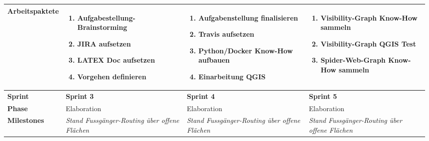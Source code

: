 \begin{landscape}
\begin{longtable}{l p{5.5cm} p{5.5cm} p{5.5cm}}
        \textbf{Arbeitspaktete}
                                & \begin{enumerate}[noitemsep]
                                    \item Aufgabestellung-Brainstorming
                                    \item JIRA aufsetzen
                                    \item LATEX Doc aufsetzen
                                    \item Vorgehen definieren
                                \end{enumerate}
                                & \begin{enumerate}[noitemsep]
                                    \item Aufgabenstellung finalisieren
                                    \item Travis aufsetzen
                                    \item Python/Docker Know-How aufbauen
                                    \item Einarbeitung QGIS
                                \end{enumerate}
                                & \begin{enumerate}[noitemsep]
                                    \item Visibility-Graph Know-How sammeln
                                    \item Visibility-Graph QGIS Test
                                    \item Spider-Web-Graph Know-How sammeln
                                \end{enumerate}  \\
        
        \toprule
        \textbf{Sprint}
                                & \textbf{Sprint 3}
                                & \textbf{Sprint 4}
                                & \textbf{Sprint 5} \\
        
        \midrule
        \textbf{Phase}
                                & Elaboration
                                & Elaboration
                                & Elaboration \\
        
        \textbf{Milestones}
                                & \textit{Stand Fussgänger-Routing über offene Flächen}
                                & \textit{Stand Fussgänger-Routing über offene Flächen}
                                & \textit{Stand Fussgänger-Routing über offene Flächen}  \\
        

\end{longtable}
\end{landscape}
